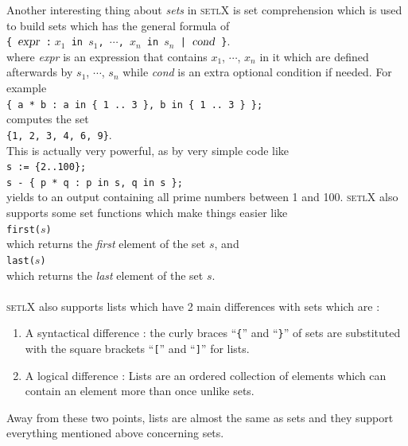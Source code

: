\documentclass[11pt]{article}
\begin{document}
Another interesting thing about \textsl{sets} in \textsc{setlX} is set comprehension which is used to build sets which has the general formula of
\\[0.2cm]
\hspace*{1.3cm}
\texttt{\{ $\textsl{expr}$ :$\;x_1$ in $s_1$, $\cdots$, $x_n$ in $s_n$ | $\textsl{cond}$ \}}.
\\[0.2cm]
where \textsl{expr} is an expression that contains $x_1$, $\cdots$, $x_n$ in it which are defined afterwards by $s_1$, $\cdots$, $s_n$ while \textsl{cond} is an extra optional condition if needed. For example 
\\[0.2cm]
\hspace*{1.3cm}
\texttt{\{ a * b : a in \{ 1 .. 3 \}, b in \{ 1 .. 3 \} \};}
\\[0.2cm]
computes the set
\\[0.2cm]
\hspace*{1.3cm}
\texttt{\{1, 2, 3, 4, 6, 9\}}.
\\[0.2cm]
This is actually very powerful, as by very simple code like
\\[0.2cm]
\hspace*{1.3cm}
\texttt{s := \{2..100\};}
\\
\hspace*{1.3cm}
\texttt{s - \{ p * q : p in s, q in s \};}
\\[0.2cm]
yields to an output containing all prime numbers between 1 and 100.
\textsc{setlX} also supports some set functions which make things easier like
\\[0.2cm]
\hspace*{1.3cm}
\texttt{first($s$)}
\\[0.2cm]
which returns the \emph{first} element of the set $s$, and
\\[0.2cm]
\hspace*{1.3cm}
\texttt{last($s$)} 
\\[0.2cm]
which returns the \emph{last} element of the set $s$.
\\
\\
\textsc{setlX} also supports lists which have 2 main differences with sets which are :
\begin{enumerate}
\item A syntactical difference : the
curly braces ``\texttt{\{}'' and ``\texttt{\}}'' of sets are substituted with the square brackets
``\texttt{[}'' and ``\texttt{]}'' for lists.
\item A logical difference :  Lists are an ordered collection of elements which can contain an element more than once unlike sets.
\end{enumerate} 
Away from these two points, lists are almost the same as sets and they support everything mentioned above concerning sets.
\\
\end{document}
